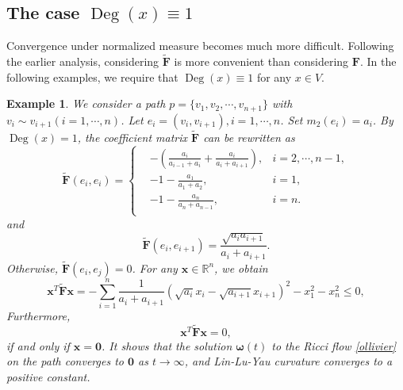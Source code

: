 \documentclass{article}
\newtheorem{example}{Example}
\begin{document}
\subsection{The case $\operatorname{Deg}(x)\equiv1$}
Convergence under normalized measure becomes much more difficult.  Following the earlier analysis, considering $\mathbf{\tilde{F}}$ is more convenient than considering $\mathbf{F}$. In the following examples, we require that $\operatorname{Deg}(x)\equiv1$ for any $x\in V.$
\begin{example}
    We consider a  path $p=\{v_1,v_2,\cdots,v_{n+1}\}$ with $v_i\sim v_{i+1}(i=1,\cdots,n)$. Let $e_i=(v_i,v_{i+1}), i=1,\cdots, n$. Set $m_2(e_i)=a_i$.
    By  $\operatorname{Deg}(x)=1$, the coefficient matrix $\mathbf{\tilde{F}}$ can be rewritten as 
\[\mathbf{\tilde{F}}(e_i,e_i)
=\left\{\begin{aligned}
  & -\left(\frac{a_i}{a_{i-1}+a_i}+\frac{a_i}{a_i+a_{i+1}}\right),
& i= 2,\cdots, n-1,\\
  & -1-\frac{a_1}{a_1+a_2},& i=1,\\
  &-1-\frac{a_n}{a_n+a_{n-1}},& i=n.\\
\end{aligned}
  \right.\]
  and 
\[\mathbf{\tilde{F}}(e_i,e_{i+1})=\frac{\sqrt{a_ia_{i+1}}}{a_i+a_{i+1}}.\]
Otherwise, $\mathbf{\tilde{F}}(e_i,e_{j})=0$.
For any $\bm{x}\in \mathbb{R}^n$, we obtain 
\[\bm{x}^T\mathbf{\tilde{F}}\bm{x}=-\sum_{i=1}^n\frac{1}{a_i+a_{i+1}}(\sqrt{a_i}x_i-\sqrt{a_{i+1}}x_{i+1})^2-x_1^2-x_{n}^2\leq0,\]
Furthermore,
\[\bm{x}^T\mathbf{\tilde{F}}\bm{x}=0,\]
if and only if $\bm{x}=\mathbf{0}$. It shows that the solution $\bm{\omega}(t)$ to the Ricci flow \eqref{ollivier}  on the path converges to $\bm 0$ as $t\rightarrow \infty$, and Lin-Lu-Yau curvature converges  to a positive constant.



\end{example}
\end{document}
